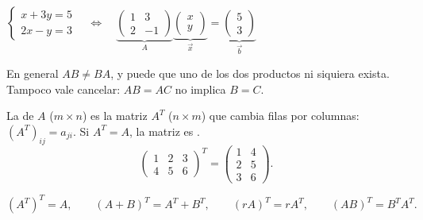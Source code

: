 \documentclass[11pt,a4paper]{article}
\let\zukanivel\nivel
\renewcommand{\nivel}[2]{\needspace{5\baselineskip}\zukanivel{#1}{#2}}
\begin{document}
\begin{clavebox}
$\displaystyle \begin{cases} x+3y=5\\ 2x-y=3 \end{cases}\quad\Longleftrightarrow\quad
\underbrace{\begin{pmatrix} 1 & 3\\ 2 & -1 \end{pmatrix}}_{A}\underbrace{\begin{pmatrix} x\\ y \end{pmatrix}}_{\vec x}
=\underbrace{\begin{pmatrix} 5\\ 3 \end{pmatrix}}_{\vec b}$
\end{clavebox}

\begin{ojo}
En general $AB\neq BA$, y puede que uno de los dos productos ni siquiera exista. Tampoco vale cancelar:
$AB=AC$ no implica $B=C$.
\end{ojo}


\begin{definicion}[Transpuesta]
La  de $A$ ($m\times n$) es la matriz $A^T$ ($n\times m$) que cambia filas por columnas:
$(A^T)_{ij}=a_{ji}$. Si $A^T=A$, la matriz es .
\[ \begin{pmatrix} 1 & 2 & 3\\ 4 & 5 & 6 \end{pmatrix}^{T}=\begin{pmatrix} 1 & 4\\ 2 & 5\\ 3 & 6 \end{pmatrix}. \]
\end{definicion}

\begin{propiedad}
\[ (A^T)^T=A,\qquad (A+B)^T=A^T+B^T,\qquad (rA)^T=rA^T,\qquad (AB)^T=B^TA^T. \]
\end{propiedad}
\end{document}

